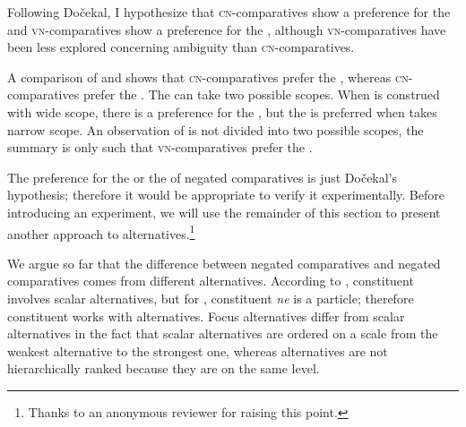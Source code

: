 \documentclass[output=paper, colorlinks, citecolor=brown, newtxmath]{langsci/langscibook}
\begin{document}
Following Dočekal, I hypothesize that  \textsc{cn-}comparatives show a preference for the  and \textsc{vn-}comparatives show a preference for the , although  \textsc{vn-}comparatives have been less explored concerning ambiguity than \textsc{cn-}comparatives.

A comparison of  and  shows that  \textsc{cn-}com\-par\-a\-tives prefer the , whereas  \textsc{cn-}comparatives prefer the . The  can take two possible scopes. When   is construed with wide scope, there is a preference for the , but the  is preferred when  takes narrow scope. An observation of   is not divided into two possible scopes, the summary is only such that  \textsc{vn-}comparatives prefer the .

The preference for the  or the  of  negated comparatives is just Dočekal's hypothesis; therefore it would be appropriate to verify it experimentally. Before introducing an experiment, we will use the remainder of this section to present another approach to alternatives.\footnote{Thanks to an anonymous reviewer for raising this point.}

We argue so far that the difference between  negated comparatives and  negated comparatives comes from different alternatives. According to \cite{nouwen2008upper},  constituent  involves scalar alternatives, but for \cite{dovcekal2017upper},  constituent  \textit{ne} is a  particle; therefore  constituent  works with  alternatives. Focus alternatives differ from scalar alternatives in the fact that scalar alternatives are ordered on a scale from the weakest alternative to the strongest one, whereas  alternatives are not hierarchically ranked because they are on the same level.
\end{document}
